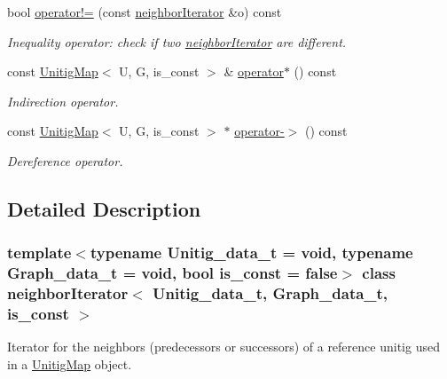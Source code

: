 \begin{DoxyCompactItemize}
bool \hyperlink{classneighborIterator_a95d8840e2114007102d64d9013a7169e}{operator!=} (const \hyperlink{classneighborIterator}{neighbor\+Iterator} \&o) const
\begin{DoxyCompactList}\small\item\em Inequality operator\+: check if two \hyperlink{classneighborIterator}{neighbor\+Iterator} are different. \end{DoxyCompactList}\item 
const \hyperlink{classUnitigMap}{Unitig\+Map}$<$ U, G, is\+\_\+const $>$ \& \hyperlink{classneighborIterator_a4481d0b5d4b31cc0e3f9064f8906f70b}{operator$\ast$} () const
\begin{DoxyCompactList}\small\item\em Indirection operator. \end{DoxyCompactList}\item 
const \hyperlink{classUnitigMap}{Unitig\+Map}$<$ U, G, is\+\_\+const $>$ $\ast$ \hyperlink{classneighborIterator_a9626c1843dc3134a53756c7c0c3309da}{operator-\/$>$} () const
\begin{DoxyCompactList}\small\item\em Dereference operator. \end{DoxyCompactList}\end{DoxyCompactItemize}


\subsection{Detailed Description}
\subsubsection*{template$<$typename Unitig\+\_\+data\+\_\+t = void, typename Graph\+\_\+data\+\_\+t = void, bool is\+\_\+const = false$>$\newline
class neighbor\+Iterator$<$ Unitig\+\_\+data\+\_\+t, Graph\+\_\+data\+\_\+t, is\+\_\+const $>$}

Iterator for the neighbors (predecessors or successors) of a reference unitig used in a \hyperlink{classUnitigMap}{Unitig\+Map} object. 

